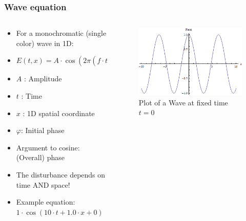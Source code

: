 \begin{frame}
    \frametitle{Wave equation}

    \begin{columns}[t, onlytextwidth]
        \begin{column}{0.5\textwidth}
            \begin{itemize}
                \item For a monochromatic (single color) wave in 1D:
                \item $E(t,x) = A \cdot \cos\left( 2 \pi \left(f \cdot t + \frac{x}{\lambda} \right) + \varphi \right)$
                \item $A$ : Amplitude
                \item $t$ : Time
                \item $x$ : 1D spatial coordinate
                \item $\varphi$: Initial phase
                \item Argument to cosine: (Overall) phase
                \item The disturbance depends on time AND space!
                \item Example equation: $ 1 \cdot \cos(10 \cdot t + 1.0 \cdot x + 0) $
            \end{itemize}
        \end{column}\begin{column}{0.5\textwidth}
            \begin{figure}
                \includegraphics[width=\textwidth]{figures/Wave_t0.png}
                \caption{Plot of a Wave at fixed time $t=0$}
            \end{figure}
        \end{column}
    \end{columns}



\end{frame}


